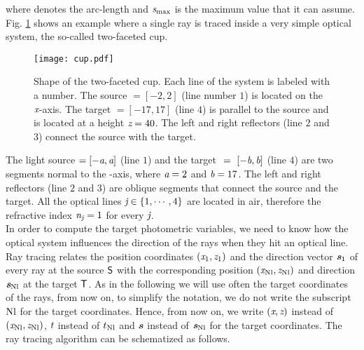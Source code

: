 where  denotes the arc-length and $\textit{s}_{\textrm{max}}$ is the maximum value that it can assume.
Fig. \ref{fig:cup} shows an example where a single ray is traced inside a very simple optical system, the so-called two-faceted cup.
\begin{figure}[h]
\label{fig:cup}
  \begin{center}
\vspace{-1.5cm}
  \texttt{[image: cup.pdf]}
  \end{center}
\vspace{-2cm}
  \caption{\footnotesize{Shape of the two-faceted cup.  Each line of the system is labeled with a number.
   The source $= [-2,2]$ (line number $1$) is located on the $\textit{x}$-axis.
   The target $= [-17, 17]$ (line $4$) is parallel to the source and is located at a height $\textit{z}= 40$.
   The left and right reflectors (line $2$ and $3$) connect the source with the target.}}
  \label{fig:cup}
\end{figure}
The light source $= [-\textit{a}, \textit{a}]$ (line $1$) and the target $~=~ [-\textit{b}, \textit{b}]$ (line $4$) are two segments normal to the -axis, where $\textit{a}=2$ and $\textit{b}=17$.
The left and right reflectors (line $2$ and $3$) are oblique segments that connect the source and the target.
All the optical lines $\textit{j} \in \{1, \cdots, 4\}$  are located in air, therefore the refractive index $\textit{n}_{\textit{j}}=1$ for every $\textit{j}$. \\ \indent
In order to compute the target photometric variables, we need to know how the optical system influences the direction of the rays when they hit an optical line.
Ray tracing relates the position coordinates
 $ (\textit{x}_1, \textit{z}_1)$ and the direction vector $\textit{\textbf{s}}_1$ of every ray at the source $\textsf{S}$ with the corresponding position $(\textit{x}_{\textrm{Nl}}, \textit{z}_{\textrm{Nl}})$ and direction $\textit{\textbf{s}}_{\textrm{Nl}}$
 at the target $\textsf{T}$. As in the following we will use often the target coordinates of the rays, from now on, to simplify the notation, we do not write the subscript $\textrm{Nl}$ for the target coordinates. Hence, from now on, we write $(\textit{x},\textit{z})$ instead of $(\textit{x}_{\textrm{Nl}}, \textit{z}_{\textrm{Nl}})$,  $t$ instead of $t_{\textrm{Nl}}$ and $\textit{\textbf{s}}$ instead of $\textit{\textbf{s}}_{\textrm{Nl}}$ for the target coordinates.
The ray tracing algorithm can be schematized as follows.
